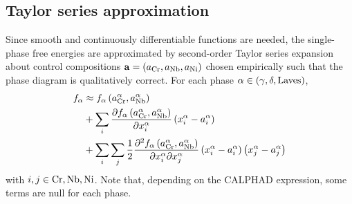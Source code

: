 \documentclass[10pt]{article}
\begin{document}
		\subsection{Taylor series approximation}
		Since smooth and continuously differentiable functions are needed, the single-phase free energies are approximated
		by second-order Taylor series expansion about control compositions $\mathbf{a}=(a_{\ce{Cr}}, a_{\ce{Nb}}, a_{\ce{Ni}})$
		chosen empirically such that the phase diagram is qualitatively correct. %
		For each phase $\alpha\in(\gamma,\delta,\ce{Laves})$,
		\begin{align}\nonumber
			f_{\alpha} &\approx f_{\alpha}\left(a_{\ce{Cr}}^{\alpha}, a_{\ce{Nb}}^{\alpha}\right)\\\nonumber
	                            &+ \sum\limits_{i}\frac{\partial f_{\alpha}\left(a_{\ce{Cr}}^{\alpha}, a_{\ce{Nb}}^{\alpha}\right)}{\partial x_i^{\alpha}}
	                              \left(x_i^{\alpha} - a_i^{\alpha}\right)\\
	                            &+ \sum\limits_{i}\sum\limits_{j}\frac{1}{2}\frac{\partial^2 f_{\alpha}\left(a_{\ce{Cr}}^{\alpha}, a_{\ce{Nb}}^{\alpha}\right)}
	                              {\partial x_i^{\alpha} \partial x_j^{\alpha}}
	                              \left(x_i^{\alpha} - a_i^{\alpha}\right)\left(x_j^{\alpha} - a_j^{\alpha}\right)
		\end{align}
		with $i,j\in\ce{Cr},\ce{Nb},\ce{Ni}$. Note that, depending on the CALPHAD expression, some terms are null for each phase.

\end{document}
